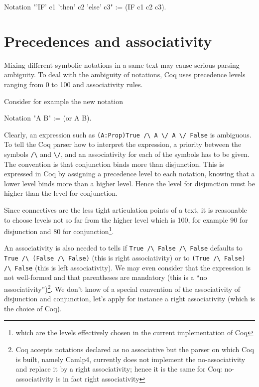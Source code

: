 \begin{coq_example*}
Notation "'IF' c1 'then' c2 'else' c3" := (IF c1 c2 c3).
\end{coq_example*}


\section{Precedences and associativity}

Mixing different symbolic notations in a same text may cause serious
parsing ambiguity. To deal with the ambiguity of notations, Coq uses
precedence levels ranging from 0 to 100 and associativity rules.

Consider for example the new notation

\begin{coq_example*}
Notation "A \/ B" := (or A B).
\end{coq_example*}

Clearly, an expression such as {\tt (A:Prop)True \verb=/\= A
\verb=\/= A \verb=\/= False} is ambiguous. To tell the Coq parser how
to interpret the expression, a priority between the symbols \verb=/\=
and \verb=\/=, and an associativity for each of the symbols has to be
given. The convention is that conjunction binds more than
disjunction. This is expressed in Coq by assigning a precedence level
to each notation, knowing that a lower level binds more than a higher
level. Hence the level for disjunction must be higher than the level
for conjunction.

Since connectives are the less tight articulation points of a text, it
is reasonable to choose levels not so far from the higher level which
is 100, for example 90 for disjunction and 80 for
conjunction\footnote{which are the levels effectively chosen in the
current implementation of Coq}.

An associativity is also needed to tells if {\tt True \verb=/\=
False \verb=/\= False} defaults to {\tt True \verb=/\= (False
\verb=/\= False)} (this is right associativity) or to {\tt (True
\verb=/\= False) \verb=/\= False} (this is left associativity). We may
even consider that the expression is not well-formed and that
parentheses are mandatory (this is a ``no associativity'')\footnote{
Coq accepts notations declared as no associative but the parser on
which Coq is built, namely Camlp4, currently does not implement the
no-associativity and replace it by a right associativity; hence it is
the same for Coq: no-associativity is in fact right associativity}.
We don't know of a special convention of the associativity of
disjunction and conjunction, let's apply for instance a right
associativity (which is the choice of Coq).

